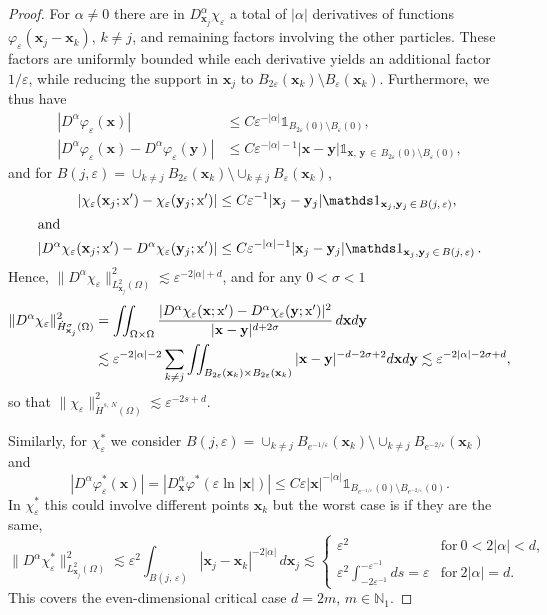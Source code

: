 \documentclass[AHL, Unicode, longabstracts, published]{cedram}
\newcommand*\eps{\varepsilon}
\newcommand*\N {\mathbb{N}}
\newcommand\1{{\ensuremath {\mathds 1} }}
\newcommand{\bx}{\mathbf{x}}
\newcommand{\by}{\mathbf{y}}
\newcommand{\sx}{\textup{x}}
\begin{document}
\begin{proof}
For $\alpha \neq 0$ there are in $D^\alpha_{\bx_j} \chi_\eps$ a total of $|\alpha|$ derivatives of functions $\varphi_\eps(\bx_j-\bx_k)$, $k \neq j$, and remaining factors involving the other particles. These factors are uniformly bounded while each derivative yields an additional factor $1/\eps$, while reducing the support in $\bx_j$ to $B_{2\eps}(\bx_k) \setminus B_{\eps}(\bx_k)$. Furthermore, we thus have
\begin{align*}
|D^\alpha \varphi_\eps(\bx)|&\le C \eps^{-|\alpha|} \1_{B_{2\eps}(0) \setminus B_{\eps}(0)},
\\
|D^\alpha \varphi_\eps(\bx) - D^\alpha \varphi_\eps(\by)|&\le C \eps^{-|\alpha|-1} |\bx-\by| \1_{\bx,\,\by\,\in\,B_{2\eps}(0) \setminus B_{\eps}(0)},
\end{align*}
and for $B(j,\eps) = \cup_{k \neq j} B_{2\eps}(\bx_k) \setminus \cup_{k \neq j} B_{\eps}(\bx_k)$,
\begin{align*}
|\chi_\eps(\bx_j;\sx') - \chi_\eps(\by_j;\sx')|
&\le C \eps^{-1}|\bx_j-\by_j|
\1_{\bx_j,\by_j\,\in\,B(j,\,\eps)},
\\
\intertext{and}
|D^\alpha \chi_\eps(\bx_j;\sx') - D^\alpha \chi_\eps(\by_j;\sx')|
&\le C \eps^{-|\alpha|-1}|\bx_j-\by_j|
\1_{\bx_j,\by_j\,\in\,B(j,\,\eps)}\,.
\end{align*}
Hence, $\|D^\alpha \chi_\eps\|_{L^2_{\bx_j}(\Omega)}^2 \lesssim \eps^{-2|\alpha|+d}$, and for any $0<\sigma<1$
\begin{align*}
\|D^\alpha \chi_\eps\|_{\dot{H}^\sigma_{\bx_j}(\Omega)}^2 &= \iint_{\Omega \times \Omega} \dfrac{|D^\alpha\chi_\eps(\bx;\sx') - D^\alpha\chi_\eps(\by;\sx')|^2}{|\bx-\by|^{d+2\sigma}}\,d\bx d\by \\
&\lesssim \eps^{-2|\alpha|-2} \sum_{k \neq j} \iint_{B_{2\eps}(\bx_k) \times B_{2\eps}(\bx_k)} |\bx - \by|^{-d-2\sigma+2} d\bx d\by
\lesssim \eps^{-2|\alpha|-2\sigma+d},
\end{align*}
so that $\|\chi_\eps\|_{\dot{H}^{s,\,N}(\Omega)}^2 \lesssim \eps^{-2s+d}$.

Similarly, for $\chi_\eps^*$ we consider $B(j,\eps) = \cup_{k \neq j} B_{e^{-1/\eps}}(\bx_k) \setminus \cup_{k \neq j} B_{e^{-2/\eps}}(\bx_k)$ and
\begin{equation}\label{eq:phi_star_bound}
|D^\alpha\varphi_\eps^*(\bx)| = \left|D^\alpha_\bx \varphi^*(\eps\ln|\bx|)\right|
\le C \eps |\bx|^{-|\alpha|} \1_{B_{e^{-1/\eps}}(0) \setminus B_{e^{-2/\eps}}(0)}.
\end{equation}
In $\chi_\eps^*$ this could involve different points $\bx_k$ but the worst case is if they are the same,
\[
\|D^\alpha \chi_\eps^*\|_{L^2_{\bx_j}(\Omega)}^2
\lesssim \eps^{2} \int_{B(j,\,\eps)} |\bx_j - \bx_k|^{-2|\alpha|} \,d\bx_j
\lesssim
\begin{cases} \eps^{2} & \text{for}\ 0<2|\alpha|<d, \\
\eps^{2} \int_{-2\eps^{-1}}^{-\eps^{-1}} ds = \eps & \text{for}\ 2|\alpha|=d.
\end{cases}
\]
This covers the even-dimensional critical case $d=2m$, $m \in \N_1$.


\end{proof}
\end{document}
